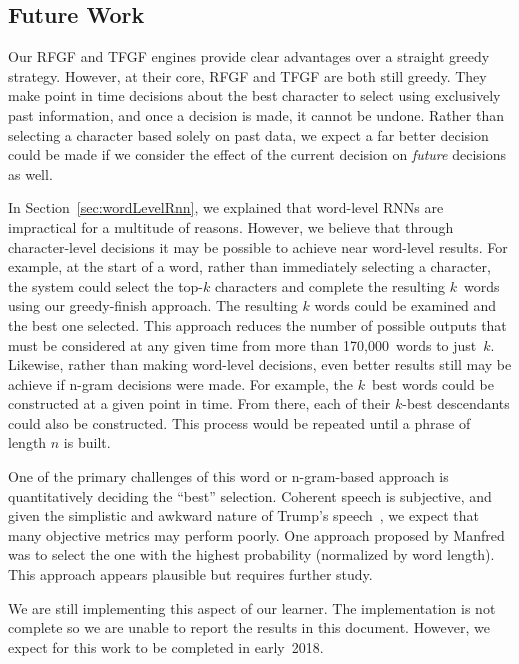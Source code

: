 \documentclass{article}
\begin{document}
\subsection{Future Work}

Our RFGF and TFGF engines provide clear advantages over a straight greedy strategy.  However, at their core, RFGF and TFGF are both still greedy.  They make point in time decisions about the best character to select using exclusively past information, and once a decision is made, it cannot be undone.  Rather than selecting a character based solely on past data, we expect a far better decision could be made if we consider the effect of the current decision on \textit{future} decisions as well.

In Section~\ref{sec:wordLevelRnn}, we explained that word-level RNNs are impractical for a multitude of reasons. However, we believe that through character-level decisions it may be possible to achieve near word-level results.  For example, at the start of a word, rather than immediately selecting a character, the system could select the top-$k$ characters and complete the resulting $k$~words using our greedy-finish approach.  The resulting $k$ words could be examined and the best one selected.  This approach reduces the number of possible outputs that must be considered at any given time from more than 170,000~words to just~$k$.  Likewise, rather than making word-level decisions, even better results still may be achieve if n-gram decisions were made.  For example, the $k$~best words could be constructed at a given point in time.  From there, each of their $k$-best descendants could also be constructed.  This process would be repeated until a phrase of length $n$ is built.  

One of the primary challenges of this word or n-gram-based approach is quantitatively deciding the ``best'' selection.  Coherent speech is subjective, and given the simplistic and awkward nature of Trump's speech~\cite{goldhill2017}, we expect that many objective metrics may perform poorly. One approach proposed by Manfred was to select the one with the highest probability (normalized by word length). This approach appears plausible but requires further study.

We are still implementing this aspect of our learner.  The implementation is not complete so we are unable to report the results in this document.  However, we expect for this work to be completed in early~2018.



\end{document}

